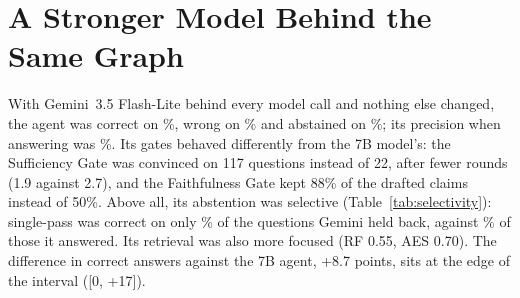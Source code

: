\section{A Stronger Model Behind the Same Graph}

With Gemini~3.5 Flash-Lite behind every model call and nothing else changed, the
agent was correct on \nGemCorrect\%, wrong on \nGemWrong\% and abstained on \nGemAbstain\%;
its precision when answering was \nGemPrec\%. Its gates behaved differently from the
7B model's: the Sufficiency Gate was convinced on 117 questions instead of 22, after
fewer rounds (1.9 against 2.7), and the Faithfulness Gate kept 88\% of the drafted
claims instead of 50\%. Above all, its abstention was selective
(Table~\ref{tab:selectivity}): single-pass was correct on only \nSelGemHeld\% of the
questions Gemini held back, against \nSelGemAns\% of those it answered. Its retrieval was
also more focused (RF 0.55, AES 0.70). The difference in correct answers against the
7B agent, +8.7 points, sits at the edge of the interval ([0, +17]).
